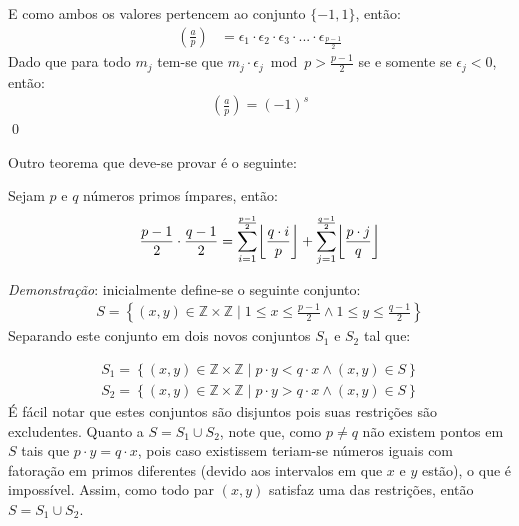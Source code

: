 E como ambos os valores pertencem ao conjunto $\{-1, 1\}$, então:
\begin{align*}
    \left(\frac{a}{p}\right) & = \epsilon_1 \cdot \epsilon_2 \cdot \epsilon_3 \cdot ... \cdot \epsilon_{\frac{p-1}{2}}
\end{align*}
Dado que para todo $m_j$ tem-se que $m_j \cdot \epsilon_j \bmod{p} > \frac{p-1}{2}$ se e somente se $\epsilon_j < 0$, então:
\begin{align*}
    \left(\frac{a}{p}\right) = (-1)^s
\end{align*} \qed

\DeclarePairedDelimiter\ceil{\lceil}{\rceil}
\DeclarePairedDelimiter\floor{\lfloor}{\rfloor}

Outro teorema que deve-se provar é o seguinte:
\begin{teorema} \label{teorema:somatorio-grafico}Sejam $p$ e $q$ números primos ímpares, então:
    \begin{equation} \label{eq:pointsnum}
    \frac{p-1}{2} \cdot \frac{q-1}{2} = \sum_{i = 1}^{\frac{p-1}{2}} \floor*{\frac{q \cdot i}{p}} + \sum_{j = 1}^{\frac{q-1}{2}} \floor*{\frac{p \cdot j}{q}}
    \end{equation}
\end{teorema}

\noindent
\textit{Demonstração}: inicialmente define-se o seguinte conjunto:
\begin{align*}
    S = \left\{ (x, y) \in \mathbb{Z} \times \mathbb{Z} \;\bigg|\; 1 \leq x \leq \frac{p-1}{2} \land 1 \leq y \leq \frac{q-1}{2} \right\}
\end{align*}
Separando este conjunto em dois novos conjuntos $S_1$ e $S_2$ tal que:

\begin{align*}
    S_1 = \left\{ (x, y) \in \mathbb{Z} \times \mathbb{Z} \;\big|\; p \cdot y < q \cdot x \land (x,y) \in S\right\}
    \\
    S_2 = \left\{ (x, y) \in \mathbb{Z} \times \mathbb{Z} \;\big|\; p \cdot y > q \cdot x \land (x,y) \in S\right\}
\end{align*}
É fácil notar que estes conjuntos são disjuntos pois suas restrições são excludentes. Quanto a $S = S_1 \cup S_2$, note que, como $p \neq q$ não existem pontos em $S$ tais que $p \cdot y = q \cdot x$, pois caso existissem teriam-se números iguais com fatoração em primos diferentes (devido aos intervalos em que $x$ e $y$ estão), o que é impossível. Assim, como todo par $(x, y)$ satisfaz uma das restrições, então $S = S_1 \cup S_2$.

